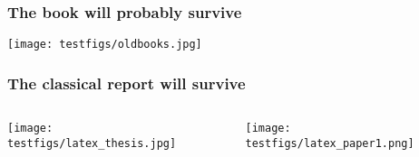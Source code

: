 \documentclass{beamer}
\begin{document}
\begin{frame}
\frametitle{The book will probably survive}

\vspace{6mm}

\centerline{\texttt{[image: testfigs/oldbooks.jpg]}}

\vspace{6mm}
\end{frame}

\begin{frame}
\frametitle{The classical report will survive}

\begin{columns}
\vspace{6mm}

\centerline{\texttt{[image: testfigs/latex\_thesis.jpg]}}

\vspace{6mm}


\vspace{6mm}

\centerline{\texttt{[image: testfigs/latex\_paper1.png]}}

\vspace{6mm}


\end{columns}
\end{frame}
\end{document}
